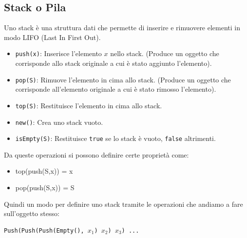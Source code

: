 \documentclass[a4paper]{article}
\begin{document}
\subsection{Stack o Pila}
\begin{definition}
  Uno stack è una struttura dati che permette di inserire e rimuovere elementi in modo LIFO (Last In First Out). 
  \begin{itemize}
      \item \texttt{push(x)}: Inserisce l'elemento \( x \) nello stack. 
      (Produce un oggetto che corrisponde allo stack originale a cui è stato aggiunto l'elemento).
      \item \texttt{pop(S)}: Rimuove l'elemento in cima allo stack. (Produce un oggetto che corrisponde all'elemento originale a cui è stato rimosso l'elemento).
      \item \texttt{top(S)}: Restituisce l'elemento in cima allo stack.
      \item \texttt{new()}: Crea uno stack vuoto.
      \item \texttt{isEmpty(S)}: Restituisce \texttt{true} se lo stack è vuoto, \texttt{false} altrimenti.
  \end{itemize}
\end{definition}

Da queste operazioni si possono definire certe proprietà come:

\begin{itemize}
  \item top(push(S,x)) = x
  \item pop(push(S,x)) = S
\end{itemize}
Quindi un modo per definire uno stack tramite le operazioni che andiamo a fare sull'oggetto stesso:

\begin{center}
\texttt{Push(Push(Push(Empty(), $x_1$) $x_2$) $x_3$) ...}
\end{center}
\end{document}
